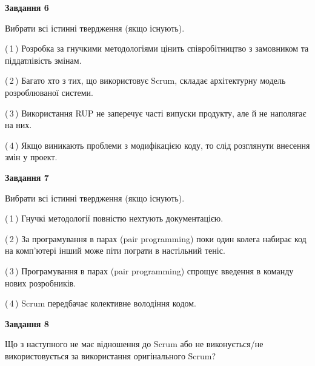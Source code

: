 \documentclass[10pt, ukrainian]{article}
\begin{document}
{\begin {large}
\newpage

{\begin {center}\textbf{Завдання 6}\end {center}}\par
Вибрати всі істинні твердження (якщо існують).\par
\vspace{2mm}



(\,1\,) Розробка за гнучкими методологіями цінить співробітництво з замовником та піддатлівість змінам. %



(\,2\,) Багато хто з тих, що використовує Scrum, складає архітектурну модель розроблюваної системи. %



(\,3\,) Використання RUP не заперечує часті випуски продукту, але й не наполягає на них. %



(\,4\,) Якщо виникають проблеми з модифікацією коду, то слід розглянути внесення змін у проект. %


{\begin {center}\textbf{Завдання 7}\end {center}}\par
Вибрати всі істинні твердження (якщо існують).\par
\vspace{2mm}



(\,1\,) Гнучкі методології повністю нехтують документацією. %



(\,2\,) За програмування в парах (pair programming) поки один колега набирає код на комп'ютері інший може піти пограти в настільний теніс. %



(\,3\,) Програмування в парах (pair programming) спрощує введення в команду нових розробників. %



(\,4\,) Scrum передбачає колективне володіння кодом. %


{\begin {center}\textbf{Завдання 8}\end {center}}\par
Що з наступного не має відношення до Scrum або не виконується/не використовується за використання оригінального Scrum?\par
\vspace{2mm}




\end{large}}
\end{document}
